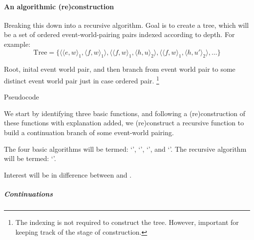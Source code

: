 \paragraph{An algorithmic (re)construction}

\begin{note}
  Breaking this down into a recursive algorithm.
  Goal is to create a tree, which will be a set of ordered event-world-pairing pairs indexed according to depth.
  For example:
  \[\text{Tree} = \{\langle \langle e,w \rangle_{1}, \langle f,w \rangle_{1} \rangle, \langle \langle f,w \rangle_{1}, \langle h,u \rangle_{2} \rangle, \langle \langle f,w \rangle_{1}, \langle h,u' \rangle_{2} \rangle, \dots \}\]

  Root, inital event world pair, and then branch from event world pair to some distinct event world pair just in case ordered pair.
  \footnote{
    The indexing is not required to construct the tree.
    However, important for keeping track of the stage of construction.
  }

  {\color{red} Pseudocode}
  \nocite{Cormen:2009uw}

  We start by identifying three basic functions, and following a (re)construction of these functions with explanation added, we (re)construct a recursive function to build a continuation branch of some event-world pairing.

  The four basic algorithms will be termed:
  `\AlgAC{}', `\AlgGetStops{}', `\AlgGetPStops{}', and `\AlgFindBranches{}'.
  The recursive algorithm will be termed:
  `\AlgDevelopTree{}'.

  Interest will be in difference between \AlgGetStops{} and \AlgGetPStops{}.
\end{note}

\subparagraph{Continuations}

